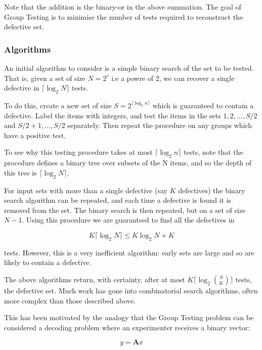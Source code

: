 \documentclass[12pt, a4paper]{article}
\begin{document}
Note that the addition is the binary-or in the above summation. The goal of Group Testing is to minimise the number of tests required to reconstruct the defective set.

\subsubsection*{Algorithms}
An initial algorithm to consider is a simple binary search of the set to be tested. That is, given a set of size \(N = 2^r\) i.e a powre of 2, we can recover a single defective in
\(\lceil{\log_2{N}}\rceil\) tests.

To do this, create a new set of size \(S = 2^{\lceil{\log_2{n}}\rceil}\) which is guaranteed to contain a defective. Label the items with integers, and test the items in the sets \({1,2,\ldots ,S/2}\) and \({S/2 + 1,\ldots ,S/2}\) separately. Then repeat the procedure on any groups which have a positive test. 

To see why this testing procedure takes at most \(\lceil{\log_2{n}}\rceil\) tests, note that the procedure defines a binary tree over subsets of the N items, and so the depth of this tree is \(\lceil{\log_2{N}}\rceil\).

For input sets with more than a single defective (say \(K\) defectives) the binary search algorithm can be repeated, and each time a defective is found it is removed from the set. The binary search is then repeated, but on a set of size \(N-1\). Using this procedure we are guaranteed to find all the defectives in 

\begin{equation}
K \lceil \log_2{N} \rceil \leq K\log_2{N} + K
\end{equation}

tests. However, this is a very inefficient algorithm: early sets are large and so are likely to contain a defective.

The above algorithms return, with certainty, after at most \(K\lceil \log_2{N\choose K}\rceil\) tests, the defective set. Much work has gone into combinatorial search algorithms, often more complex than those described above. 

This has been motivated by the analogy that the Group Testing problem can be considered a decoding problem where an experimenter receives a binary vector: 

\begin{equation}
y = \textbf{A}x
\end{equation}
\end{document}
